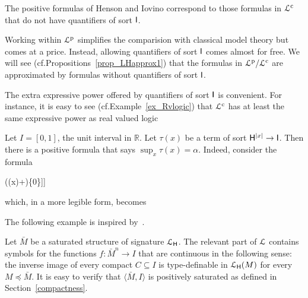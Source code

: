 \documentclass[10pt,oneside]{amsproc}
\def\dotminus{\stackon[.2ex]{$-$}{$.$}}
\def\forallH{\forall}
\def\existsH{\exists}
\def\forallI{\forall}
\newcommand\dangersign[1][3.5ex]{%
  \renewcommand\stacktype{L}%
  \scaleto{\stackon[1.9pt]{\Huge\color{red}$\triangle$}{\color{red}\bfseries\small !}}{#1}%
}
\begin{document}

The positive formulas of Henson and Iovino correspond to those formulas in ${\EuScript L}^{\rm c}$ that do not have quantifiers of sort ${\sf I}$.

Working within ${\EuScript L}^{\rm p}$ simplifies the comparision with classical model theory but comes at a price.
Instead, allowing quantifiers of sort ${\sf I}$ comes almost for free.
We will see (cf.\@ Propositions~\ref{prop_LHapprox1}) that the formulas in ${\EuScript L}^{\rm p}/{\EuScript L}^{\rm c}$ are approximated by formulas without quantifiers of sort ${\sf I}$.

The extra expressive power offered by quantifiers of sort ${\sf I}$ is convenient.
For instance, it is easy to see (cf.\@ Example~\ref{ex_Rvlogic}) that ${\EuScript L}^{\rm c}$ has at least the same expressive power as real valued logic%

\begin{example}\label{ex_Rvlogic}
  Let $I=[0,1]$, the unit interval in $\mathds{R}$.
  Let $\tau(x)$ be a term of sort ${\sf H}^{|x|}\to {\sf I}$.
  Then there is a positive formula that says $\sup_x \tau(x)=\alpha$.
  Indeed, consider the formula

  \ceq{\hfill\forallH x\ \big[\tau(x)\dotminus\alpha\in\{0\}\big]}
  {\wedge}{\forallI \varepsilon \Big[\varepsilon\in\{0\}\ \vee\ \existsH x\ \big[\alpha\dotminus (\tau(x)+\varepsilon)\in\{0\}\big]\Big]}

  which, in a more legible form, becomes

  \ceq{\hfill\forallH x\ \big[\tau(x)\le\alpha\big]}{\wedge}{\forallI \varepsilon>0\ \existsH x\ \big[\alpha\le \tau(x)+ \varepsilon\big].}
\end{example}

The following example is inspired by~\cite{HPP}.

\begin{example}\label{ex_HPP}
  Let $\bar M$ be a saturated structure of signature ${\EuScript L}_{\sf H}$.
  The relevant part of ${\EuScript L}$ contains symbols for the functions $f:\bar M^n\to I$ that are continuous in the following sense: the inverse image of every compact $C\subseteq I$ is type-definable in ${\EuScript L}_{\sf H}(M)$ for every $M\preceq\bar M$.
  It is easy to verify that $\langle\bar M, I\rangle$ is positively saturated as defined in Section~\ref{compactness}.
\end{example}
\end{document}
